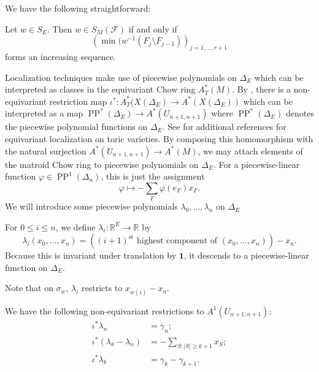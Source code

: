 \documentclass[ALCO,published]{cedram}
\numberwithin{equation}{section}
\numberwithin{figure}{section}
\newcommand{\R}{\mathbb{R}}
\newcommand{\cF}{\mathcal{F}}
\begin{document}
We have the following straightforward:
\begin{lemma} \label{l:smcondition}
Let $w\in S_{E}$. Then $w\in S_M(\cF)$ if and only if  
\[\left(\min(w^{-1}(F_j\setminus F_{j-1})\right)_{j=1,\dots,r+1}\]
forms an increasing sequence. 
\end{lemma}

Localization techniques make use of piecewise polynomials \cite{Brion:piecewise} on $\Delta_{E}$ which can be interpreted as classes in the equivariant Chow ring $A^*_T(M)$. By \cite{EG:equivariant}, there is a non-equivariant restriction map $\iota^*\colon A_T^*(X(\Delta_{E})\to A^*(X(\Delta_{E}))$ which can be interpreted as a map
$\operatorname{PP}^*(\Delta_{E})\to A^*(U_{n+1,n+1})$ where $\operatorname{PP}^*(\Delta_{E})$ denotes the piecewise polynomial functions on $\Delta_{E}$. See  \cite{KP:localization} for additional references for equivariant localization on toric varieties.
By composing this homomorphism with the natural surjection $A^*(U_{n+1,n+1})\to A^*(M)$, we may attach elements of the matroid Chow ring to piecewise polynomials on $\Delta_{E}$. For a piecewise-linear function $\varphi\in \operatorname{PP}^1(\Delta_n)$, this is just the assignment
\[\varphi\mapsto -\sum_F \varphi(e_F)x_F.\]
We will introduce some piecewise polynomials $\lambda_0,\dots,\lambda_n$ on $\Delta_{E}$ 

\begin{defi}
  For $0\leq i\leq n$, we define $\lambda_i\colon \R^{E}\to \R$ by
  \[\lambda_i(x_0,\dots,x_n)=\left((i+1)^\text{st}\text{ highest component of } (x_0,\dots,x_n)\right)-x_n.\]
  Because this is invariant under translation by $\mathbf{1}$, it descends to a piecewise-linear function on $\Delta_{E}$.
\end{defi}

Note that on $\sigma_w$, $\lambda_i$ restricts to $x_{w(i)}-x_n.$

\begin{lemma} We have the following non-equivariant restrictions to $A^1(U_{n+1,n+1})$:
\begin{align*}
    \iota^*\lambda_n&=\gamma_n;\\
    \iota^*(\lambda_k-\lambda_n)&=-\sum_{S\colon |S|\geq k+1} x_S;\\
    \iota^*\lambda_{k}&=\gamma_{k}-\gamma_{k+1}.
\end{align*}
\end{lemma}
\end{document}
